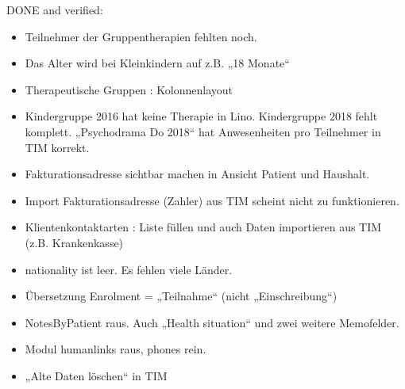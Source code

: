 \documentclass[letterpaper,10pt,ngerman]{sphinxmanual}
\begin{document}
DONE and verified:
\begin{itemize}
\item {} 
Teilnehmer der Gruppentherapien fehlten noch.

\item {} 
Das Alter wird bei Kleinkindern auf z.B. „18 Monate“

\item {} 
Therapeutische Gruppen : Kolonnenlayout

\item {} 
Kindergruppe 2016 hat keine Therapie in Lino. Kindergruppe 2018
fehlt komplett.  „Psychodrama Do 2018“ hat Anwesenheiten pro
Teilnehmer in TIM korrekt.

\item {} 
Fakturationsadresse sichtbar machen in Ansicht Patient und Haushalt.

\item {} 
Import Fakturationsadresse (Zahler) aus TIM scheint nicht zu funktionieren.

\item {} 
Klientenkontaktarten : Liste füllen und auch Daten importieren aus
TIM (z.B. Krankenkasse)

\item {} 
nationality ist leer. Es fehlen viele Länder.

\item {} 
Übersetzung Enrolment = „Teilnahme“ (nicht „Einschreibung“)

\item {} 
NotesByPatient raus. Auch „Health situation“ und zwei weitere
Memofelder.

\item {} 
Modul humanlinks raus, phones rein.

\item {} 
„Alte Daten löschen“ in TIM

\end{itemize}
\end{document}
